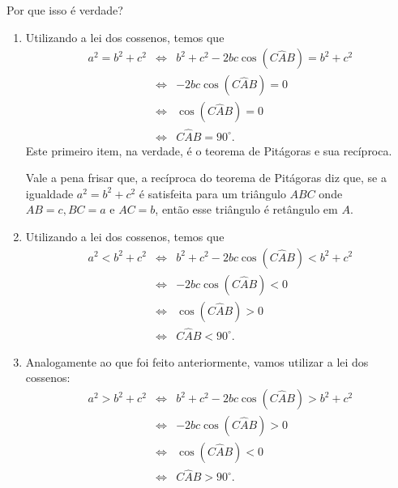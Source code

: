 Por que isso é verdade?

\begin{enumerate}
    \item{}
    Utilizando a lei dos cossenos, temos que 
    $$\begin{array}{ccl}
        a^2 = b^2+c^2 & \iff & b^2+c^2-2bc\cos (C\hat{A}B) = b^2+c^2 \\
                      & \iff & -2bc\cos (C\hat{A}B)= 0\\
                      & \iff & \cos (C\hat{A}B)=0\\
                      & \iff & C\hat{A}B=90^\circ.
    \end{array}$$
    Este primeiro item, na verdade, é o teorema de Pitágoras e sua recíproca. 
    
    Vale a pena frisar que, a recíproca do teorema de Pitágoras diz que, se a igualdade $a^2=b^2+c^2$ é satisfeita para um triângulo $ABC$ onde $AB=c, BC=a$ e $AC=b$, então esse triângulo é retângulo em $A$.
    
    \item{}
    Utilizando a lei dos cossenos, temos que 
    $$\begin{array}{ccl}
        a^2 < b^2+c^2 & \iff & b^2+c^2-2bc\cos (C\hat{A}B)< b^2+c^2 \\
                      & \iff & -2bc\cos (C\hat{A}B)< 0\\
                      & \iff & \cos (C\hat{A}B)>0\\
                      & \iff & C\hat{A}B<90^\circ.
    \end{array}$$
    
    \item{}
    Analogamente ao que foi feito anteriormente, vamos utilizar a lei dos cossenos: 
    $$\begin{array}{ccl}
        a^2 > b^2+c^2 & \iff & b^2+c^2-2bc\cos (C\hat{A}B) > b^2+c^2 \\
                      & \iff & -2bc\cos (C\hat{A}B) > 0\\
                      & \iff & \cos (C\hat{A}B) < 0\\
                      & \iff & C\hat{A}B > 90^\circ.
    \end{array}$$
\end{enumerate}

